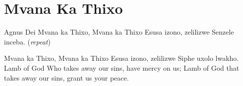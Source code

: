 \starttocol
\chapter{Mvana Ka Thixo}
\nexttocol
A{\sc gnus Dei}\hfill{\it }
\stoptocol
\starttocol
\startlines
M{\sc vana} ka Thixo, Mvana ka Thixo
Esusa izono, zelilizwe
Senzele inceba. \hfill({\it repeat})~~~~~~~~~

Mvana ka Thixo, Mvana ka Thixo
Esusa izono, zelilizwe
Siphe uxolo lwakho.
\stoplines
\nexttocol
Lamb of God Who takes away our sins, have mercy on us; Lamb of God that takes away our sins, grant us your peace.
\stoptocol

